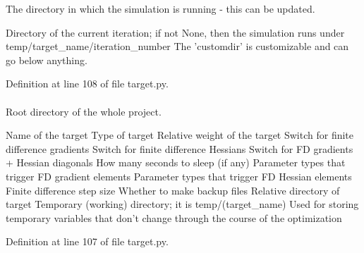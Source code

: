 \-The directory in which the simulation is running -\/ this can be updated. 

\-Directory of the current iteration; if not \-None, then the simulation runs under temp/target\-\_\-name/iteration\-\_\-number \-The 'customdir' is customizable and can go below anything.

\-Definition at line 108 of file target.\-py.

\hypertarget{classforcebalance_1_1target_1_1Target_aede2856573b890cd47054ad36937d6f6}{
\paragraph[{tempdir}]{}}\label{classforcebalance_1_1target_1_1Target_aede2856573b890cd47054ad36937d6f6}


\-Root directory of the whole project. 

\-Name of the target \-Type of target \-Relative weight of the target \-Switch for finite difference gradients \-Switch for finite difference \-Hessians \-Switch for \-F\-D gradients + \-Hessian diagonals \-How many seconds to sleep (if any) \-Parameter types that trigger \-F\-D gradient elements \-Parameter types that trigger \-F\-D \-Hessian elements \-Finite difference step size \-Whether to make backup files \-Relative directory of target \-Temporary (working) directory; it is temp/(target\-\_\-name) \-Used for storing temporary variables that don't change through the course of the optimization 

\-Definition at line 107 of file target.\-py.

\hypertarget{classforcebalance_1_1BaseClass_afd68efa29ccd2f320f4cf82198214aac}{
\paragraph[{verbose\-\_\-options}]{}}\label{classforcebalance_1_1BaseClass_afd68efa29ccd2f320f4cf82198214aac}


